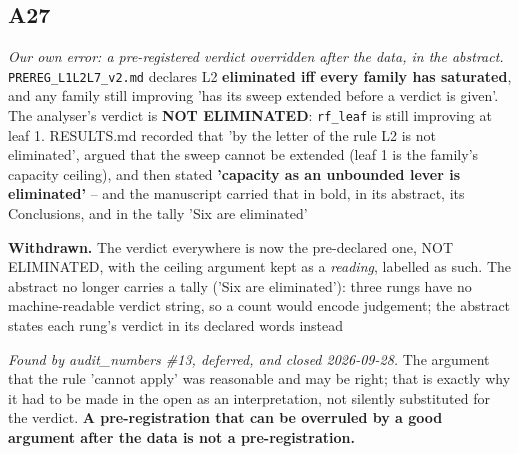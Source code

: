 \documentclass[10pt]{article}
\begin{document}
\subsection*{A27}\label{led:A27}
\begin{description}[leftmargin=0pt,itemsep=1pt]
\item[Claim withdrawn.] \emph{Our own error: a pre-registered verdict overridden after the data, in the abstract.} \texttt{PREREG\_L1L2L7\_v2.md} declares L2 \textbf{eliminated iff every family has saturated}, and any family still improving 'has its sweep extended before a verdict is given'. The analyser's verdict is \textbf{NOT ELIMINATED}: \texttt{rf\_leaf} is still improving at leaf 1. RESULTS.md recorded that 'by the letter of the rule L2 is not eliminated', argued that the sweep cannot be extended (leaf 1 is the family's capacity ceiling), and then stated \textbf{'capacity as an unbounded lever is eliminated'} -- and the manuscript carried that in bold, in its abstract, its Conclusions, and in the tally 'Six are eliminated'
\item[Replaced with.] \textbf{Withdrawn.} The verdict everywhere is now the pre-declared one, NOT ELIMINATED, with the ceiling argument kept as a \emph{reading}, labelled as such. The abstract no longer carries a tally ('Six are eliminated'): three rungs have no machine-readable verdict string, so a count would encode judgement; the abstract states each rung's verdict in its declared words instead
\item[Why it was wrong.] \emph{Found by audit\_numbers \#13, deferred, and closed 2026-09-28.} The argument that the rule 'cannot apply' was reasonable and may be right; that is exactly why it had to be made in the open as an interpretation, not silently substituted for the verdict. \textbf{A pre-registration that can be overruled by a good argument after the data is not a pre-registration.}
\end{description}
\end{document}

